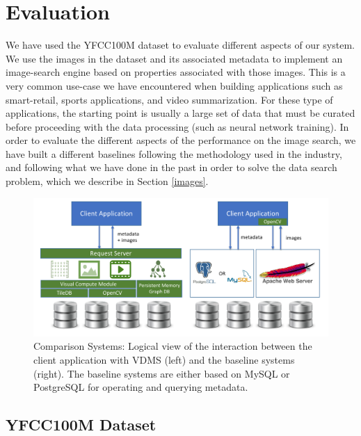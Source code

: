 \section{Evaluation}
\label{eval}

We have used the YFCC100M dataset to evaluate different aspects of our system.
We use the images in the dataset and its associated metadata to implement
an image-search engine based on properties associated with those images.
This is a very common use-case we have encountered when building
applications such as smart-retail, sports applications, and video summarization.
For these type of applications, the starting point is usually
a large set of data that must be curated
before proceeding with the data processing (such as neural network training).
In order to evaluate the different aspects of the performance on the
image search, we have built a different baselines following the methodology
used in the industry, and following what we have done in the past
in order to solve the data search problem,
which we describe in Section \ref{images}.

\begin{figure}
\centering
\includegraphics[width=\textwidth]{figures/comparison_system}
\caption{Comparison Systems: Logical view of the interaction between the client application with VDMS (left) and the baseline systems (right). The baseline systems are either based on MySQL or PostgreSQL for operating and querying metadata.}
\label{fig:systems}
\end{figure}

\subsection{YFCC100M Dataset}
\label{dataset}

